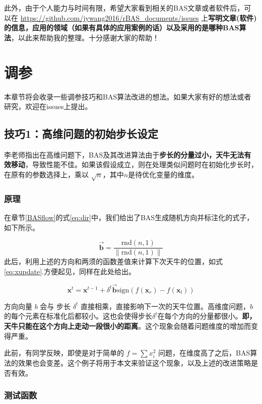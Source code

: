\documentclass[]{ctexbook}
\begin{document}
此外，由于个人能力与时间有限，希望大家看到相关的BAS文章或者软件后，可以在
\url{https://github.com/jywang2016/rBAS_documents/issues}
上\textbf{写明文章(软件)的信息，应用的领域（如果有具体的应用案例的话）以及采用的是哪种BAS算法}，以此来帮助我的整理。十分感谢大家的帮助！

\chapter{调参}\label{parsTuning}

本章节将会收录一些调参技巧和BAS算法改进的想法。如果大家有好的想法或者研究，欢迎在issues上提出。

\section{技巧1：高维问题的初始步长设定}\label{1}

李老师指出在高维问题下，BAS及其改进算法由于\textbf{步长的分量过小，天牛无法有效移动}，导致性能不佳。如果该假设成立，则在处理类似问题时在初始化步长时，在原有的参数选择上，乘以
\(\sqrt{n}\)，其中\(n\)是待优化变量的维度。

\subsection{原理}

在章节\ref{BASflow}的式\eqref{eq:dir}中，我们给出了BAS生成随机方向并标注化的式子，如下所示。

\[
\overrightarrow{\mathbf{b}}=\frac{\text{rnd}(n,1)}{\|\text{rnd}(n,1)\|}
\]
此后，利用上述的方向和两须的函数差值来计算下次天牛的位置，如式\eqref{eq:xupdate}.方便起见，同样在此处给出。

\[
\mathbf{x}^t=\mathbf{x}^{t-1}+\delta^t\overrightarrow{\mathbf{b}}\text{sign}(f(\mathbf{x}_r)-f(\mathbf{x}_l))
\tag{2}
\]

方向向量 \(b\) 会与 步长 \(\delta^t\)
直接相乘，直接影响下一次的天牛位置。高维度问题，\(b\)
的每个元素在标准化后都较小。这也会使得步长\(\delta^t\)在每个方向的分量都很小。\textbf{即，天牛只能在这个方向上走动一段很小的距离}。这个现象会随着问题维度的增加而变得严重。

此前，有同学反映，即使是对于简单的 \(f = \sum x_i^2\)
问题，在维度高了之后，BAS算法的效果也会变差。这个例子将用于本文来验证这个现象，以及上述的改进策略是否有效。

\subsection{测试函数}
\end{document}
